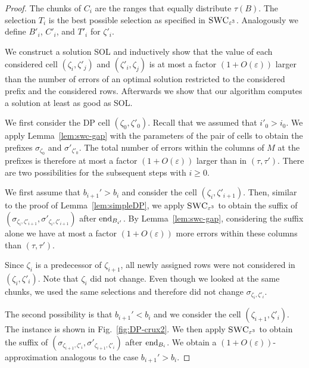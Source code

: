\begin{proof}
    The chunks of $C_i$ are the ranges that equally distribute $\tau(B)$. The selection $T_i$ is the best possible selection as specified in $\textsc{SWC}_{\varepsilon^3}$.
    Analogously we define $B'_i$, $C'_i$, and $T'_i$ for $\zeta'_i$.

    We construct a solution SOL and inductively show that the value of each considered cell $(\zeta_i,\zeta'_j)$ and $(\zeta'_i,\zeta_j)$ is at most a factor $(1+O(\varepsilon))$ larger than the number of errors of an optimal solution restricted to the considered prefix and the considered rows. 
    Afterwards we show that our algorithm computes a solution at least as good as SOL.

    We first consider the DP cell $(\zeta_0,\zeta'_0)$.
    Recall that we assumed \WLOG that $i'_0 > i_0$.
    We apply Lemma~\ref{lem:swc-gap} with the parameters of the pair of cells to obtain the prefixes $\sigma_{\zeta_0}$ and $\sigma'_{\zeta'_0}$.
    The total number of errors within the columns of $M$ at the prefixes is therefore at most a factor $(1+O(\varepsilon))$ larger than in $(\tau,\tau')$.
    There are two possibilities for the subsequent steps with $i \ge 0$.

    We first assume that $b_{i+1}' > b_{i}$ and consider the cell $(\zeta_{i},\zeta'_{i+1})$.
    Then, similar to the proof of Lemma~\ref{lem:simpleDP}, we apply $\textsc{SWC}_{\varepsilon^3}$ to obtain the suffix of $({\sigma}_{\zeta_i,\zeta'_{i+1}},{\sigma'}_{\zeta_i,\zeta'_{i+1}})$ after $\textrm{end}_{B_{i'}}$.
    By Lemma~\ref{lem:swc-gap}, considering the suffix alone we have at most a factor $(1+O(\varepsilon))$ more errors within these columns than $(\tau,\tau')$.

    Since $\zeta_i$ is a predecessor of $\zeta_{i+1}$, all newly assigned rows were not considered in $(\zeta_i,\zeta'_i)$.
    Note that $\zeta_i$ did not change. Even though we looked at the same chunks, we used the same selections and therefore did not change $\sigma_{\zeta_i,\zeta'_i}$.

    The second possibility is that $b_{i+1}' < b_{i}$ and we consider the cell $(\zeta_{i+1},\zeta'_{i})$. The instance is shown in Fig.~\ref{fig:DP-crux2}.
    We then apply $\textsc{SWC}_{\varepsilon^3}$ to obtain the suffix of $({\sigma}_{\zeta_{i+1},\zeta'_{i}},{\sigma'}_{\zeta_{i+1},\zeta'_{i}})$ after $\textrm{end}_{B_{i}}$.
    We obtain a $(1+O(\varepsilon))$-approximation analogous to the case $b_{i+1}' > b_{i}$.
\end{proof}

